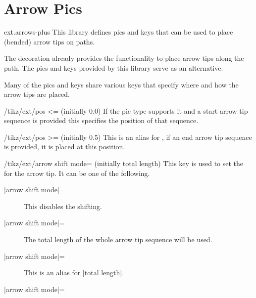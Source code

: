 %
%
%

\section{Arrow Pics}
\label{tikzlibrary:arrows}
\tikzset{external/export/.try=false}%
\begin{tikzlibrary}{ext.arrows-plus}
  This library defines pics and keys
  that can be used to place (bended) arrow tips on paths.
\end{tikzlibrary}

\begin{multicols}{2}
The  decoration
already provides the functionality to place arrow tips along the path.
The pics and keys provided by this library serve as an alternative.

Many of the pics and keys share various keys that specify
where and how the arrow tips are placed.
\begin{key}{/tikz/ext/pos <= (initially 0.0)}
If the pic type supports it and a start arrow tip sequence is provided
this specifies the position of that sequence.
\end{key}
\begin{key}{/tikz/ext/pos >= (initially 0.5)}
This is an alias for ,
if an end arrow tip sequence is provided, it is placed at this position.
\end{key}

\begin{key}{/tikz/ext/arrow shift mode= (initially total length)}
This key is used to set the  for the arrow tip.
It can be one of the following.
\begin{description}
\item[|arrow shift mode|=]

  This disables the shifting.
\item[|arrow shift mode|=]

  The total length of the whole arrow tip sequence will be used.
\item[|arrow shift mode|=]

  This is an alias for |total length|.
\item[|arrow shift mode|=]


\end{description}
\end{key}
\end{multicols}
